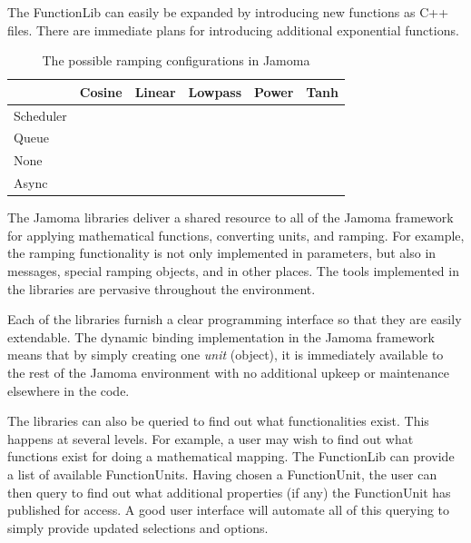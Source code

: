 \documentclass{article}
\begin{document}
The FunctionLib can easily be expanded by introducing new functions as C++ files. There are immediate plans for introducing additional exponential functions.
 




\begin{table}
\begin{center}
\footnotesize\noindent
\begin{tabular}{|l|l|l|l|l|l|}
\hline
          & Cosine & Linear & Lowpass & Power & Tanh \\
\hline
Scheduler &        &        &         &       & \\
\hline
Queue	  &        &        &         &       & \\
\hline
None	  &        &        &         &       & \\
\hline
Async	  &        &        &         &       & \\
\hline
\end{tabular}
\end{center}
\caption{The possible ramping configurations in Jamoma}
\label{tab:ramp_possibilities}
\end{table}




The Jamoma libraries deliver a shared resource to all of the Jamoma framework for applying mathematical functions, converting units, and ramping. For example, the ramping functionality is not only implemented in parameters, but also in messages, special ramping objects, and in other places. The tools implemented in the libraries are pervasive throughout the environment.

Each of the libraries furnish a clear programming interface so that they are easily extendable. The dynamic binding implementation in the Jamoma framework means that by simply creating one \emph{unit} (object), it is immediately available to the rest of the Jamoma environment with no additional upkeep or maintenance elsewhere in the code.

The libraries can also be queried to find out what functionalities exist. This happens at several levels.  For example, a user may wish to find out what functions exist for doing a mathematical mapping. The FunctionLib can provide a list of available FunctionUnits. Having chosen a FunctionUnit, the user can then query to find out what additional properties (if any) the FunctionUnit has published for access. A good user interface will automate all of this querying to simply provide updated selections and options.
\end{document}
